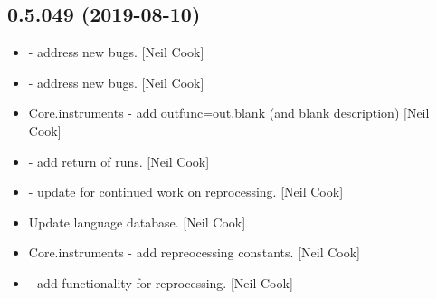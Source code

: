 \documentclass[a4paper,10pt,english]{report}
\begin{document}
\subsection{0.5.049 (2019-08-10)}
\label{\detokenize{misc/changelog:id94}}\begin{itemize}
\item {} 
 - address new bugs. {[}Neil Cook{]}

\item {} 
 - address new bugs. {[}Neil Cook{]}

\item {} 
Core.instruments - add outfunc=out.blank (and blank description) {[}Neil
Cook{]}

\item {} 
 - add return of runs. {[}Neil Cook{]}

\item {} 
 - update for continued work on reprocessing. {[}Neil
Cook{]}

\item {} 
Update language database. {[}Neil Cook{]}

\item {} 
Core.instruments - add repreocessing constants. {[}Neil Cook{]}

\item {} 
 - add functionality for reprocessing. {[}Neil Cook{]}

\end{itemize}
\end{document}
